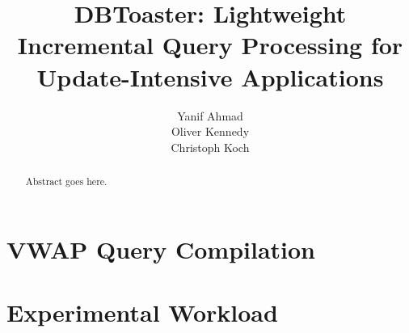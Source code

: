 \documentclass[preprint]{vldb}
\begin{document}
\title{DBToaster: Lightweight Incremental Query Processing for Update-Intensive
Applications}
\author{
\alignauthor
Yanif Ahmad\\
\alignauthor
Oliver Kennedy\\
\alignauthor
Christoph Koch\\
}
\maketitle

\begin{abstract}
Abstract goes here.
\end{abstract}












\appendix

\section{VWAP Query Compilation}

\section{Experimental Workload}
\end{document}
